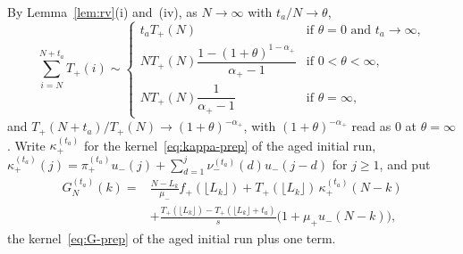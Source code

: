 By Lemma~\ref{lem:rv}(i) and~(iv), as $N\to\infty$ with $t_a/N\to\theta$,
\begin{equation}\label{eq:aged-sums}
 \sum_{i=N}^{N+t_a}T_\plus(i)\sim
 \begin{cases}
  t_aT_\plus(N)&\text{if }\theta=0\text{ and }t_a\to\infty,\\[2pt]
  NT_\plus(N)\dfrac{1-(1+\theta)^{1-\alpha_\plus}}{\alpha_\plus-1}&\text{if }0<\theta<\infty,\\[6pt]
  NT_\plus(N)\dfrac1{\alpha_\plus-1}&\text{if }\theta=\infty,
 \end{cases}
\end{equation}
and $T_\plus(N+t_a)/T_\plus(N)\to(1+\theta)^{-\alpha_\plus}$, with $(1+\theta)^{-\alpha_\plus}$ read as
$0$ at $\theta=\infty$. Write $\kappa^{(t_a)}_\plus$ for the kernel~\eqref{eq:kappa-prep} of
the aged initial run,
$\kappa^{(t_a)}_\plus(j)=\pi^{(t_a)}_\plus u_\minus(j)+\sum_{d=1}^{j}\nu^{(t_a)}_\minus(d)u_\minus(j-d)$
for $j\ge1$, and put
\begin{equation}\label{eq:aged-kernel}
\begin{split}
 G^{(t_a)}_N(k)={}&\frac{N-L_k}{\mu_\minus}f_\plus(\lfloor L_k\rfloor)+T_\plus(\lfloor L_k\rfloor)\,\kappa^{(t_a)}_\plus(N-k)\\
 &+\frac{T_\plus(\lfloor L_k\rfloor)-T_\plus(\lfloor L_k\rfloor+t_a)}{s}\bigl(1+\mu_\plus u_\minus(N-k)\bigr),
\end{split}
\end{equation}
the kernel~\eqref{eq:G-prep} of the aged initial run plus one term.

